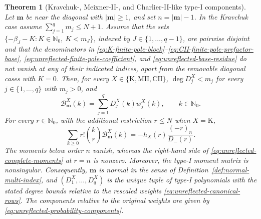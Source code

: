 \documentclass[10pt,a4paper]{amsart}
\newtheorem{theorem}{Theorem}
\newcommand{\Nzero}{\mathbb N_0}
\newcommand{\abs}[1]{\lvert#1\rvert}
\newcommand{\mm}{\boldsymbol m}
\begin{document}
\begin{theorem}[Kravchuk-, Meixner-II-, and Charlier-II-like type-I components]
\label{thm:explicit-unreflected-B}
Let \(\mm\) be near the diagonal with \(\abs\mm\ge1\), and set
\(n=\abs\mm-1\). In the Kravchuk case assume
\(\sum_{j=1}^q m_j\le N+1\). Assume that the sets
\(\{-\beta_J-K:K\in\Nzero,\ K<m_J\}\), indexed by
\(J\in\{1,\ldots,q-1\}\), are pairwise disjoint and that
the denominators in
\eqref{eq:K-finite-pole-block}--\eqref{eq:CII-finite-pole-prefactor-base},
\eqref{eq:unreflected-finite-pole-coefficient}, and
\eqref{eq:unreflected-base-residue} do not vanish at any of their indicated
indices, apart from the removable diagonal cases with \(K=0\). Then, for
every \(X\in\{\mathrm K,\mathrm{MII},\mathrm{CII}\}\),
\(\deg D_j^X<m_j\) for every
\(j\in\{1,\ldots,q\}\) with \(m_j>0\), and
\begin{equation}
 \mathcal B_{\mm}^X(k)=\sum_{j=1}^qD_j^X(k)w_j^X(k),
 \qquad k\in\Nzero.
 \label{eq:unreflected-component-decomposition}
\end{equation}
For every \(r\in\Nzero\), with the additional restriction \(r\le N\)
when \(X=\mathrm K\),
\begin{equation}
 \sum_{k\ge0}r!\binom{k}{r}\mathcal B_{\mm}^X(k)
 =-h_X(r)\frac{(-r)_n}{D_-(r)}.
 \label{eq:unreflected-complete-moments}
\end{equation}
The moments below order \(n\) vanish, whereas the right-hand side of
\eqref{eq:unreflected-complete-moments} at \(r=n\) is nonzero. Moreover,
the type-I moment matrix is nonsingular. Consequently, \(\mm\) is normal
in the sense of Definition~\ref{def:normal-multi-index}, and
\((D_1^X,\ldots,D_q^X)\) is the unique tuple of type-I polynomials with
the stated degree bounds relative to the rescaled weights
\eqref{eq:unreflected-canonical-rows}. The components relative to the
original weights are given by \eqref{eq:unreflected-probability-components}.
\end{theorem}
\end{document}
